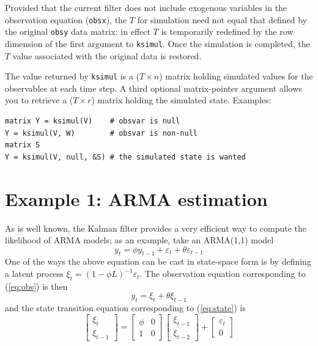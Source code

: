 \documentclass[a4paper]{article}
\begin{document}
Provided that the current filter does not include exogenous variables
in the observation equation (\texttt{obsx}), the $T$ for simulation
need not equal that defined by the original \texttt{obsy} data matrix:
in effect $T$ is temporarily redefined by the row dimension of the
first argument to \texttt{ksimul}.  Once the simulation is completed,
the $T$ value associated with the original data is restored.

The value returned by \texttt{ksimul} is a ($T \times n$) matrix
holding simulated values for the observables at each time step.  A
third optional matrix-pointer argument allows you to retrieve a ($T
\times r$) matrix holding the simulated state.  Examples:
%
\begin{verbatim}
matrix Y = ksimul(V)    # obsvar is null
Y = ksimul(V, W)        # obsvar is non-null
matrix S
Y = ksimul(V, null, &S) # the simulated state is wanted
\end{verbatim}

\section{Example 1: ARMA estimation}
\label{sec:example_arma}

As is well known, the Kalman filter provides a very efficient way to
compute the likelihood of ARMA models; as an example, take an
ARMA(1,1) model
\[
  y_t = \phi y_{t-1} + \varepsilon_t + \theta \varepsilon_{t-1}
\]
One of the ways the above equation can be cast in state-space form is
by defining a latent process $\xi_t = (1 - \phi L)^{-1}
\varepsilon_t$.   The observation equation corresponding to (\ref{eq:obs})
is then
%
\begin{equation}
y_t = \xi_t + \theta \xi_{t-1} \label{eq:arma-meas}
\end{equation}
%
and the state transition equation corresponding to (\ref{eq:state}) is
%
\[
  \left[ \begin{array}{c} \xi_t \\ \xi_{t-1} \end{array} \right] =
  \left[ \begin{array}{cc} \phi & 0 \\ 1 & 0 \end{array} \right]
  \left[ \begin{array}{c} \xi_{t-1} \\ \xi_{t-2} \end{array} \right] +
  \left[ \begin{array}{c} \varepsilon_t \\ 0 \end{array} \right] 
\]
\end{document}
